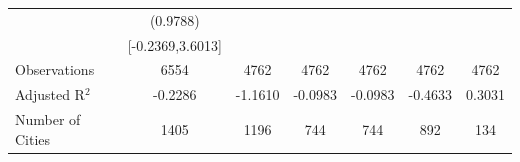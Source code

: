 \documentclass{article}
\begin{document}
\begin{table}[htbp]
\begin{tabular}{l*{6}{c}}
                    &    (0.9788)   &               &               &               &               &               \\
                    &[-0.2369,3.6013]   &               &               &               &               &               \\
\midrule
Observations        &        6554   &        4762   &        4762   &        4762   &        4762   &        4762   \\
Adjusted R$^2$      &     -0.2286   &     -1.1610   &     -0.0983   &     -0.0983   &     -0.4633   &      0.3031   \\
Number of Cities    &        1405   &        1196   &         744   &         744   &         892   &         134   \\
\bottomrule
\end{tabular}
\end{table}
\end{document}
